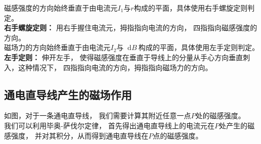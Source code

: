 \documentclass[UTF8]{ctexart}
\newcommand*{\dif}{\mathop{}\!\mathrm{d}}
\begin{document}
    磁感强度的方向始终垂直于由电流元$I_1$与$r$构成的平面，具体使用右手螺旋定则判定。\\[2mm]
    \textbf{右手螺旋定则：}
    用右手握住电流元，拇指指向电流的方向，
    四指指向磁感强度的方向。\\[4mm]
    磁场力的方向始终垂直于由电流元$I_2$与$\dif B\:$构成的平面，具体使用左手定则判定。\\[2mm]
    \textbf{左手定则：}
    伸开左手，
    使得磁感强度在垂直于导线上的分量从手心方向垂直刺入，这种情况下，
    四指指向电流的方向，拇指指向磁场力的方向。

\newpage

\subsection{通电直导线产生的磁场作用}
    如图，对于一条通电直导线，
    我们需要计算其附近任意一点$P$处的磁感强度。\\[3mm]
    我们可以利用毕奥-萨伐尔定律，
    首先得出通电直导线上的电流元在$P$处产生的磁感强度，
    并对其积分，从而得到通电直导线在$P$点的磁感强度。\\[1mm]
\end{document}
